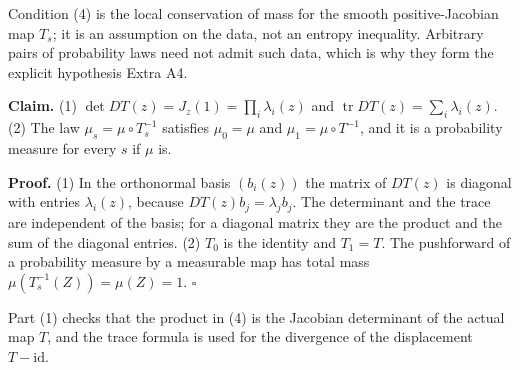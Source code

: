 \documentclass[11pt,a4paper]{report}
\begin{document}
Condition (4) is the local conservation of mass for the smooth positive-Jacobian map \(T_s\); it is an assumption on the data, not an entropy inequality. Arbitrary pairs of probability laws need not admit such data, which is why they form the explicit hypothesis Extra A4.




\textbf{Claim.} (1) \(\det DT(z)=J_z(1)=\prod_i\lambda_i(z)\) and \(\operatorname{tr}DT(z)=\sum_i\lambda_i(z)\). (2) The law \(\mu_s=\mu\circ T_s^{-1}\) satisfies \(\mu_0=\mu\) and \(\mu_1=\mu\circ T^{-1}\), and it is a probability measure for every \(s\) if \(\mu\) is.




\textbf{Proof.} (1) In the orthonormal basis \((b_i(z))\) the matrix of \(DT(z)\) is diagonal with entries \(\lambda_i(z)\), because \(DT(z)b_j=\lambda_jb_j\). The determinant and the trace are independent of the basis; for a diagonal matrix they are the product and the sum of the diagonal entries. (2) \(T_0\) is the identity and \(T_1=T\). The pushforward of a probability measure by a measurable map has total mass \(\mu(T_s^{-1}(Z))=\mu(Z)=1\). \(\square\)




Part (1) checks that the product in (4) is the Jacobian determinant of the actual map \(T\), and the trace formula is used for the divergence of the displacement \(T-\mathrm{id}\).
\end{document}
